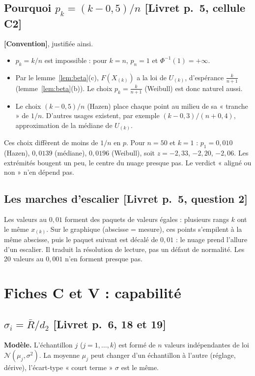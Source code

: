 \documentclass[11pt,a4paper]{article}
\theoremstyle{tq}
\theoremstyle{remark}
\newcommand{\conv}{\textcolor{orangeTQ}{\textbf{[Convention]}}}
\newcommand{\liv}[1]{\textcolor{uimmblue}{\small[Livret p.~#1]}}
\newcommand{\N}{\mathcal{N}}
\newcommand{\Rb}{\bar{R}}
\begin{document}
\subsection{Pourquoi $p_k=(k-0{,}5)/n$ \liv{5, cellule C2}}
\conv{}, justifiée ainsi.
\begin{itemize}[nosep,leftmargin=1.2em]
\item $p_k=k/n$ est impossible : pour $k=n$, $p_n=1$ et $\Phi^{-1}(1)=+\infty$.
\item Par le lemme~\ref{lem:beta}(c), $F(X_{(k)})$ a la loi de $U_{(k)}$, d'espérance $\frac{k}{n+1}$ (lemme~\ref{lem:beta}(b)). Le choix $p_k=\frac{k}{n+1}$ (Weibull) est donc naturel aussi.
\item Le choix $(k-0{,}5)/n$ (Hazen) place chaque point au milieu de sa « tranche » de $1/n$. D'autres usages existent, par exemple $(k-0{,}3)/(n+0{,}4)$, approximation de la médiane de $U_{(k)}$.
\end{itemize}
Ces choix diffèrent de moins de $1/n$ en $p$. Pour $n=50$ et $k=1$ : $p_1=0{,}010$ (Hazen), $0{,}0139$ (médiane), $0{,}0196$ (Weibull), soit $z=-2{,}33$, $-2{,}20$, $-2{,}06$. Les extrémités bougent un peu, le centre du nuage presque pas. Le verdict « aligné ou non » n'en dépend pas.

\subsection{Les marches d'escalier \liv{5, question 2}}
Les valeurs au $0{,}01$ forment des paquets de valeurs égales : plusieurs rangs $k$ ont le même $x_{(k)}$. Sur le graphique (abscisse = mesure), ces points s'empilent à la même abscisse, puis le paquet suivant est décalé de $0{,}01$ : le nuage prend l'allure d'un escalier. Il traduit la résolution de lecture, pas un défaut de normalité. Les 20 valeurs au $0{,}001$ n'en forment presque pas.

\section{Fiches C et V : capabilité}\label{sec:C}

\subsection{$\hat\sigma_i=\Rb/d_2$ \liv{6, 18 et 19}}
\textbf{Modèle.} L'échantillon $j$ ($j=1,\dots,k$) est formé de $n$ valeurs indépendantes de loi $\N(\mu_j,\sigma^2)$. La moyenne $\mu_j$ peut changer d'un échantillon à l'autre (réglage, dérive), l'écart-type « court terme » $\sigma$ est le même.
\end{document}

